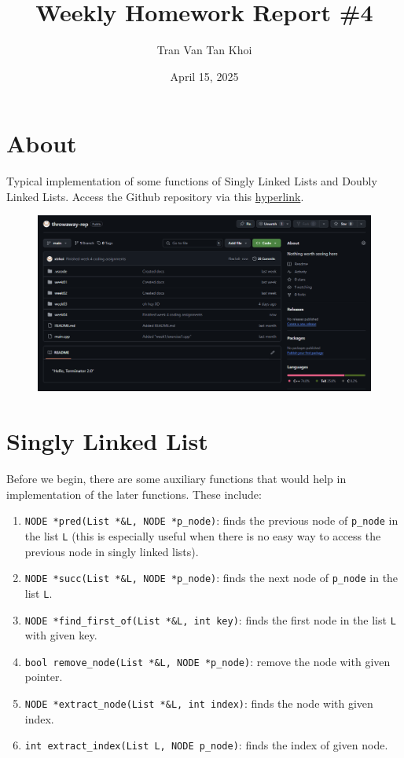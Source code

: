 \documentclass{article}
\author{Tran Van Tan Khoi}
\title{Weekly Homework Report \#4}
\date{April 15, 2025}
\begin{document}
\maketitle

\section{About}

Typical implementation of some functions of Singly Linked Lists and Doubly Linked Lists. Access the Github repository via this \href{https://github.com/xtrkoi/throwaway-re}{hyperlink}.

\begin{figure}[h]
    \centering
    \includegraphics[width=12cm]{images/image.png}
\end{figure}

\section{Singly Linked List}

Before we begin, there are some auxiliary functions that would help in implementation of the later functions. These include:

\begin{enumerate}
    \item \lstinline{NODE *pred(List *&L, NODE *p_node)}: finds the previous node of \lstinline{p_node} in the list \lstinline{L} (this is especially useful when there is no easy way to access the previous node in singly linked lists).
    \item \lstinline{NODE *succ(List *&L, NODE *p_node)}: finds the next node of \lstinline{p_node} in the list \lstinline{L}.
    \item \lstinline{NODE *find_first_of(List *&L, int key)}: finds the first node in the list \lstinline{L} with given key.
    \item \lstinline{bool remove_node(List *&L, NODE *p_node)}: remove the node with given pointer.
    \item \lstinline{NODE *extract_node(List *&L, int index)}: finds the node with given index.
    \item \lstinline{int extract_index(List L, NODE p_node)}: finds the index of given node.
\end{enumerate}
\end{document}

